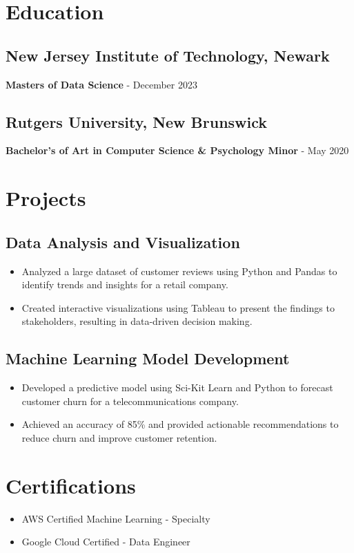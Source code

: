 \documentclass[a4paper,10pt]{article}
\begin{document}
\section{Education}

\subsection*{New Jersey Institute of Technology, Newark}
\textbf{Masters of Data Science} - December 2023

\subsection*{Rutgers University, New Brunswick}
\textbf{Bachelor’s of Art in Computer Science \& Psychology Minor} - May 2020

\section{Projects}

\subsection*{Data Analysis and Visualization}
\begin{itemize}[leftmargin=0.15in]
    \item Analyzed a large dataset of customer reviews using Python and Pandas to identify trends and insights for a retail company.
    \item Created interactive visualizations using Tableau to present the findings to stakeholders, resulting in data-driven decision making.
\end{itemize}

\subsection*{Machine Learning Model Development}
\begin{itemize}[leftmargin=0.15in]
    \item Developed a predictive model using Sci-Kit Learn and Python to forecast customer churn for a telecommunications company.
    \item Achieved an accuracy of 85\% and provided actionable recommendations to reduce churn and improve customer retention.
\end{itemize}

\section{Certifications}
\begin{itemize}[leftmargin=0.15in]
    \item AWS Certified Machine Learning - Specialty
    \item Google Cloud Certified - Data Engineer
\end{itemize}
\end{document}
